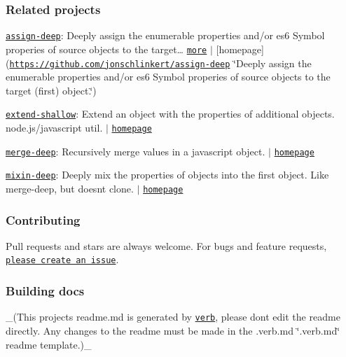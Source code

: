 \subsubsection*{Related projects}


\begin{DoxyItemize}
\item \href{https://www.npmjs.com/package/assign-deep}{\tt assign-\/deep}\+: Deeply assign the enumerable properties and/or es6 Symbol properies of source objects to the target… \href{https://github.com/jonschlinkert/assign-deep}{\tt more} $\vert$ \mbox{[}homepage\mbox{]}(\href{https://github.com/jonschlinkert/assign-deep}{\tt https\+://github.\+com/jonschlinkert/assign-\/deep} \char`\"{}\+Deeply assign the enumerable properties and/or es6 Symbol properies of source objects to the target (first) object.\char`\"{})
\item \href{https://www.npmjs.com/package/extend-shallow}{\tt extend-\/shallow}\+: Extend an object with the properties of additional objects. node.\+js/javascript util. $\vert$ \href{https://github.com/jonschlinkert/extend-shallow}{\tt homepage}
\item \href{https://www.npmjs.com/package/merge-deep}{\tt merge-\/deep}\+: Recursively merge values in a javascript object. $\vert$ \href{https://github.com/jonschlinkert/merge-deep}{\tt homepage}
\item \href{https://www.npmjs.com/package/mixin-deep}{\tt mixin-\/deep}\+: Deeply mix the properties of objects into the first object. Like merge-\/deep, but doesn\textquotesingle{}t clone. $\vert$ \href{https://github.com/jonschlinkert/mixin-deep}{\tt homepage}
\end{DoxyItemize}

\subsubsection*{Contributing}

Pull requests and stars are always welcome. For bugs and feature requests, \href{../../issues/new}{\tt please create an issue}.

\subsubsection*{Building docs}

\+\_\+(This project\textquotesingle{}s readme.\+md is generated by \href{https://github.com/verbose/verb-generate-readme}{\tt verb}, please don\textquotesingle{}t edit the readme directly. Any changes to the readme must be made in the .verb.\+md \char`\"{}.\+verb.\+md\char`\"{} readme template.)\+\_\+

